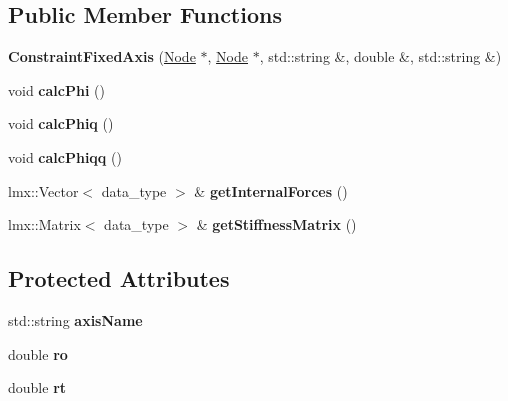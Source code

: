 \subsection*{Public Member Functions}
\begin{CompactItemize}
\item 
\hypertarget{classmknix_1_1ConstraintFixedAxis_a12bf0a882d86295d28d6c414c4a9d5e}{
\textbf{ConstraintFixedAxis} (\hyperlink{classmknix_1_1Node}{Node} $\ast$, \hyperlink{classmknix_1_1Node}{Node} $\ast$, std::string \&, double \&, std::string \&)}
\label{classmknix_1_1ConstraintFixedAxis_a12bf0a882d86295d28d6c414c4a9d5e}

\item 
\hypertarget{classmknix_1_1ConstraintFixedAxis_b5f59fd55877e45184aa90787479415c}{
void \textbf{calcPhi} ()}
\label{classmknix_1_1ConstraintFixedAxis_b5f59fd55877e45184aa90787479415c}

\item 
\hypertarget{classmknix_1_1ConstraintFixedAxis_40970d2c0103244ac5e75307247d25b9}{
void \textbf{calcPhiq} ()}
\label{classmknix_1_1ConstraintFixedAxis_40970d2c0103244ac5e75307247d25b9}

\item 
\hypertarget{classmknix_1_1ConstraintFixedAxis_10444d42c4401cf093b221d59354ab8b}{
void \textbf{calcPhiqq} ()}
\label{classmknix_1_1ConstraintFixedAxis_10444d42c4401cf093b221d59354ab8b}

\item 
\hypertarget{classmknix_1_1ConstraintFixedAxis_ad38af4a1571f59aa0e414109fd64275}{
lmx::Vector$<$ data\_\-type $>$ \& \textbf{getInternalForces} ()}
\label{classmknix_1_1ConstraintFixedAxis_ad38af4a1571f59aa0e414109fd64275}

\item 
\hypertarget{classmknix_1_1ConstraintFixedAxis_dfafd87d85a325414193e82b7c6db551}{
lmx::Matrix$<$ data\_\-type $>$ \& \textbf{getStiffnessMatrix} ()}
\label{classmknix_1_1ConstraintFixedAxis_dfafd87d85a325414193e82b7c6db551}

\end{CompactItemize}
\subsection*{Protected Attributes}
\begin{CompactItemize}
\item 
\hypertarget{classmknix_1_1ConstraintFixedAxis_71a1a8d7efc201a678dbfececa068ecb}{
std::string \textbf{axisName}}
\label{classmknix_1_1ConstraintFixedAxis_71a1a8d7efc201a678dbfececa068ecb}

\item 
\hypertarget{classmknix_1_1ConstraintFixedAxis_aef8888c92c6fcba5d4644ab0cc8c984}{
double \textbf{ro}}
\label{classmknix_1_1ConstraintFixedAxis_aef8888c92c6fcba5d4644ab0cc8c984}

\item 
\hypertarget{classmknix_1_1ConstraintFixedAxis_ae85721e0c2a16397b98fdb09ba72361}{
double \textbf{rt}}
\label{classmknix_1_1ConstraintFixedAxis_ae85721e0c2a16397b98fdb09ba72361}

\end{CompactItemize}


